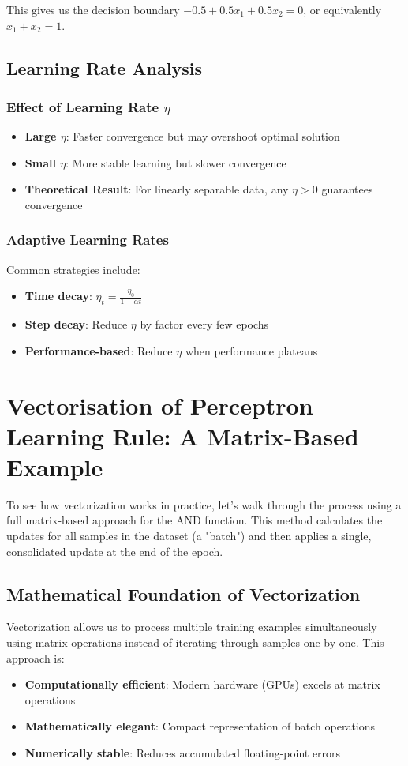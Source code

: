 This gives us the decision boundary \(-0.5 + 0.5x_1 + 0.5x_2 = 0\), or equivalently \(x_1 + x_2 = 1\).

\subsection{Learning Rate Analysis}
\subsubsection{Effect of Learning Rate \(\eta\)}
\begin{itemize}
    \item \textbf{Large \(\eta\)}: Faster convergence but may overshoot optimal solution
    \item \textbf{Small \(\eta\)}: More stable learning but slower convergence
    \item \textbf{Theoretical Result}: For linearly separable data, any \(\eta > 0\) guarantees convergence
\end{itemize}

\subsubsection{Adaptive Learning Rates}
Common strategies include:
\begin{itemize}
    \item \textbf{Time decay}: \(\eta_t = \frac{\eta_0}{1 + \alpha t}\)
    \item \textbf{Step decay}: Reduce \(\eta\) by factor every few epochs
    \item \textbf{Performance-based}: Reduce \(\eta\) when performance plateaus
\end{itemize}

\section{Vectorisation of Perceptron Learning Rule: A Matrix-Based Example}
To see how vectorization works in practice, let's walk through the process using a full matrix-based approach for the AND function. This method calculates the updates for all samples in the dataset (a "batch") and then applies a single, consolidated update at the end of the epoch.

\subsection{Mathematical Foundation of Vectorization}
Vectorization allows us to process multiple training examples simultaneously using matrix operations instead of iterating through samples one by one. This approach is:
\begin{itemize}
    \item \textbf{Computationally efficient}: Modern hardware (GPUs) excels at matrix operations
    \item \textbf{Mathematically elegant}: Compact representation of batch operations
    \item \textbf{Numerically stable}: Reduces accumulated floating-point errors
\end{itemize}

